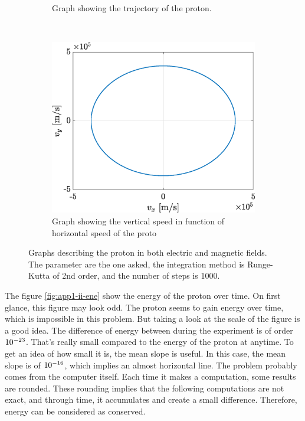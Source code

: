 \documentclass[a4paper,12pt,twoside]{article}
\begin{document}
\begin{figure}[h]
\begin{subfigure}[t]{0.32\textwidth}
	\caption{Graph showing the trajectory of the proton.}
	\label{fig:app1-ii-traj}
\end{subfigure}
~
\begin{subfigure}[t]{0.32\textwidth}
	\includegraphics[width=\textwidth]{graphs/app1_ii_vit.eps}
	\caption{Graph showing the vertical speed in function of horizontal speed of the proto}
	\label{fig:app1-ii-vit}
\end{subfigure}
\caption{Graphs describing the proton in both electric and magnetic fields. The parameter are the one asked, the integration method is Runge-Kutta of 2nd order, and the number of steps is \SI{1000}{}.}
\label{fig:app1_ii}
\end{figure}

The figure \ref{fig:app1-ii-ene} show the energy of the proton over time.
On first glance, this figure may look odd.
The proton seems to gain energy over time, which is impossible in this problem.
But taking a look at the scale of the figure is a good idea. %
The difference of energy between during the experiment is of order $\SI{d-23}{}$.
That's really small compared to the energy of the proton at anytime.
To get an idea of how small it is, the mean slope is useful.
In this case, the mean slope is of $\SI{d-16}{}$, which implies an almost horizontal line.
The problem probably comes from the computer itself.
Each time it makes a computation, some results are rounded.
These rounding implies that the following computations are not exact, and through time, it accumulates and create a small difference.
Therefore, energy can be considered as conserved.\\
\end{document}
